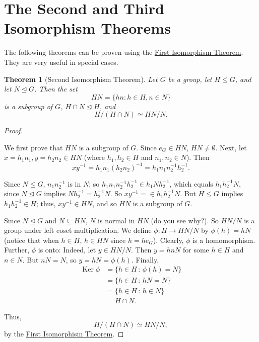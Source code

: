\documentclass[10pt,openany,oneside]{book}
\theoremstyle{plain}
\newtheorem{theorem}{Theorem}[section]
\theoremstyle{definition}
\theoremstyle{definition}
\theoremstyle{definition}
\theoremstyle{definition}
\numberwithin{equation}{section}
\DeclareMathOperator{\Ker}{Ker}
\newcommand{\amp}{&}
\begin{document}
\section[{The Second and Third Isomorphism Theorems}]{The Second and Third Isomorphism Theorems}\label{section-29}
The following theorems can be proven using the \hyperref[fit]{First Isomorphism Theorem}. They are very useful in special cases.%
\begin{theorem}[{Second Isomorphism Theorem}]\label{sit}
Let \(G\) be a group, let \(H\leq G\), and let \(N\unlhd G\). Then the set%
\begin{equation*}
HN=\{hn:h\in H, n\in N\}
\end{equation*}
is a subgroup of \(G\), \(H\cap N\unlhd H\), and%
\begin{equation*}
H/(H\cap N) \simeq
HN/N.
\end{equation*}
%
\end{theorem}
\begin{proof}\hypertarget{proof-53}{}
We first prove that \(HN\) is a subgroup of \(G\). Since \(e_G\in
HN\), \(HN\neq \emptyset\). Next, let \(x=h_1n_1, y=h_2n_2\in HN\) (where \(h_1,h_2\in H\) and \(n_1,n_2\in N\)). Then%
\begin{equation*}
xy^{-1}=h_1n_1(h_2n_2)^{-1}=h_1n_1n_2^{-1}h_2^{-1}.
\end{equation*}
%
\par
Since \(N\leq G\), \(n_1n_2^{-1}\) is in \(N\); so \(h_1n_1n_2^{-1}h_2^{-1}\in
h_1Nh_2^{-1}\), which equals \(h_1h_2^{-1}N\), since \(N\unlhd G\) implies \(Nh_2^{-1}=h_2^{-1}N\). So \(xy^{-1}=\in h_1h_2^{-1}N.\) But \(H\leq G\) implies \(h_1h_2^{-1}\in H\); thus, \(xy^{-1}\in HN\), and so \(HN\) is a subgroup of \(G\).%
\par
Since \(N\unlhd G\) and \(N\subseteq HN\), \(N\) is normal in \(HN\) (do you see why?). So \(HN/N\) is a group under left coset multiplication. We define \(\phi: H\to HN/N\) by \(\phi(h)=hN\) (notice that when \(h\in H\), \(h\in HN\) since \(h=he_G\)). Clearly, \(\phi\) is a homomorphism. Further, \(\phi\) is onto: Indeed, let \(y\in HN/N\). Then \(y=hnN\) for some \(h\in H\) and \(n\in N\). But \(nN=N\), so \(y=hN=\phi(h)\). Finally,%
\begin{align*}
\Ker \phi\amp =\{h\in H\,:\, \phi(h)=N\}\\
\amp =\{h\in H\,:\, hN=N\}\\
\amp =\{h\in
H\,:\, h\in N\}\\
\amp =H\cap N.
\end{align*}
%
\par
Thus,%
\begin{equation*}
H/(H\cap N)
\simeq HN/N,
\end{equation*}
by the \hyperref[fit]{First Isomorphism Theorem}.%
\end{proof}
\end{document}
